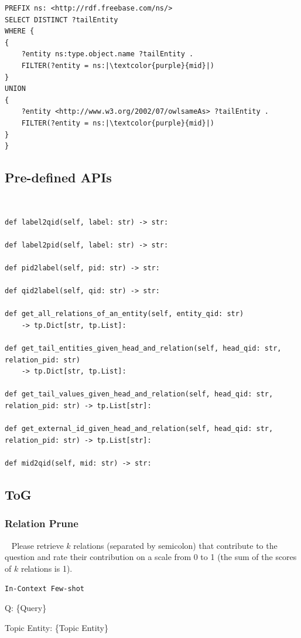 \documentclass{article} %
\begin{document}
\lstset{language=SPARQL}
\begin{lstlisting}
PREFIX ns: <http://rdf.freebase.com/ns/>
SELECT DISTINCT ?tailEntity
WHERE {
{
    ?entity ns:type.object.name ?tailEntity .
    FILTER(?entity = ns:|\textcolor{purple}{mid}|)
}
UNION
{
    ?entity <http://www.w3.org/2002/07/owlsameAs> ?tailEntity .
    FILTER(?entity = ns:|\textcolor{purple}{mid}|)
}
}
\end{lstlisting}

\subsection{Pre-defined APIs}~\label{APIs}

\lstset{language=Python}
\begin{lstlisting}
def label2qid(self, label: str) -> str:

def label2pid(self, label: str) -> str:

def pid2label(self, pid: str) -> str:

def qid2label(self, qid: str) -> str:

def get_all_relations_of_an_entity(self, entity_qid: str) 
    -> tp.Dict[str, tp.List]:

def get_tail_entities_given_head_and_relation(self, head_qid: str, relation_pid: str) 
    -> tp.Dict[str, tp.List]:

def get_tail_values_given_head_and_relation(self, head_qid: str, relation_pid: str) -> tp.List[str]:

def get_external_id_given_head_and_relation(self, head_qid: str, relation_pid: str) -> tp.List[str]:

def mid2qid(self, mid: str) -> str:
\end{lstlisting}


\subsection{ToG}
\subsubsection{Relation Prune}~\label{prompts4rel}
Please retrieve $k$ relations (separated by semicolon) that contribute to the question and rate their contribution on a scale from 0 to 1 (the sum of the scores of $k$ relations is 1).

\texttt{In-Context Few-shot}

Q: \{Query\} 

Topic Entity: \{Topic Entity\} 
\end{document}
